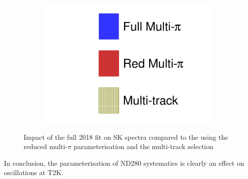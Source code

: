 \begin{figure}[h]
\begin{subfigure}[t]{0.32\textwidth}
		\includegraphics[width=\textwidth, trim={0mm 0mm 0mm 0mm}, clip, page=4]{figures/mach3/2018/data/2018_results_test_spectra_2018_results_test_redcov_spectra_2018_results_test_multitrack_spectra}
	\end{subfigure}
	
	\caption{Impact of the full 2018 fit on SK spectra compared to the using the reduced multi-$\pi$ parameterisation and the multi-track selection}
	\label{fig:sk_2018_nd280param}
\end{figure}

In conclusion, the parameterisation of ND280 systematics is clearly an effect on oscillations at T2K. 
